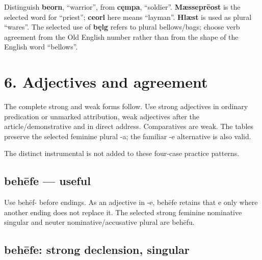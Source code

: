 Distinguish \textbf{beorn}, “warrior”, from \textbf{cęmpa}, “soldier”. \textbf{Mæsseprēost} is the selected word for “priest”; \textbf{ceorl} here means “layman”. \textbf{Hlæst} is used as plural “wares”. The selected use of \textbf{bęlg} refers to plural bellows/\allowbreak{}bags; choose verb agreement from the Old English number rather than from the shape of the English word “bellows”.

\section*{6. Adjectives and agreement}

The complete strong and weak forms follow. Use strong adjectives in ordinary predication or unmarked attribution, weak adjectives after the article/\allowbreak{}demonstrative and in direct address. Comparatives are weak. The tables preserve the selected feminine plural -a; the familiar -e alternative is also valid.

The distinct instrumental is not added to these four-case practice patterns.

\subsection*{behēfe — useful}

Use behēf- before endings. As an adjective in -e, behēfe retains that e only where another ending does not replace it. The selected strong feminine nominative singular and neuter nominative/\allowbreak{}accusative plural are behēfu.

\subsection*{behēfe: strong declension, singular}


